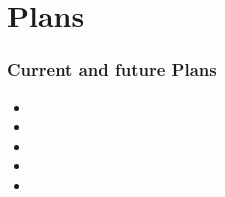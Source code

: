 \documentclass[10pt,t]{beamer}
\begin{document}
\section{Plans}
\begin{frame}
  \frametitle{Current and future Plans}
  \begin{itemize}
  \item 
  \item 
  \item 
  \item 
  \item 
    
  \end{itemize}
\end{frame}

\end{document}
